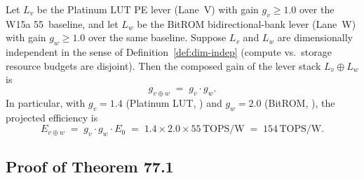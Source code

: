 \begin{theorem}
  \label{thm:lever-stack-composition}
  Let $L_v$ be the Platinum LUT PE lever (Lane~V) with gain $g_v \geq 1.0$
  over the W15a 55\, baseline, and let $L_w$ be the BitROM
  bidirectional-bank lever (Lane~W) with gain $g_w \geq 1.0$ over the same baseline.
  Suppose $L_v$ and $L_w$ are dimensionally independent in the sense of
  Definition~\ref{def:dim-indep} (compute vs.\ storage resource budgets are disjoint).
  Then the composed gain of the lever stack $L_v \oplus L_w$ is
  \begin{equation}
    g_{v \oplus w} \;=\; g_v \cdot g_w.
    \label{eq:main-theorem}
  \end{equation}
  In particular, with $g_v = 1.4$ (Platinum LUT, \cite{platinum_lut_pe_2026}) and
  $g_w = 2.0$ (BitROM, \cite{bitrom_2025}), the projected efficiency is
  \begin{equation}
    E_{v \oplus w} \;=\; g_v \cdot g_w \cdot E_0
    \;=\; 1.4 \times 2.0 \times 55\,\mathrm{TOPS/W}
    \;=\; 154\,\mathrm{TOPS/W}.
    \label{eq:projected-efficiency}
  \end{equation}
\end{theorem}


\subsection{Proof of Theorem 77.1}

